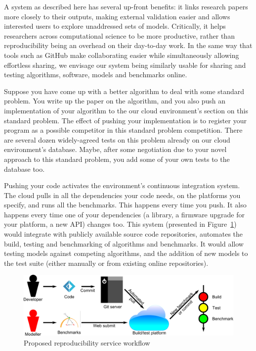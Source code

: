 \documentclass[a4paper,11pt]{article}
\begin{document}
A system as described here has several up-front benefits: it links
research papers more closely to their outputs, making external
validation easier and allows interested users to explore unaddressed
sets of models. Critically, it helps researchers across computational
science to be more productive, rather than reproducibility being an
overhead on their day-to-day work. In the same way that tools such as
GitHub make collaborating easier while simultaneously allowing
effortless sharing, we envisage our system being similarly usable for
sharing and testing algorithms, software, models and benchmarks
online.

Suppose you have come up with a better algorithm to deal with some
standard problem.  You write up the paper on the algorithm, and you
also push an implementation of your algorithm to the our cloud
environment's section on this standard problem. The effect of pushing
your implementation is to register your program as a possible
competitor in this standard problem competition. There are several
dozen widely-agreed tests on this problem already on our cloud
environment's database. Maybe, after some negotiation due to your
novel approach to this standard problem, you add some of your own
tests to the database too.

Pushing your code activates the environment's continuous integration
system.  The cloud pulls in all the dependencies your code needs, on
the platforms you specify, and runs all the benchmarks. This happens
every time you push. It also happens every time one of your
dependencies (a library, a firmware upgrade for your platform, a new
API) changes too. This system (presented in Figure~\ref{fig:workflow})
would integrate with publicly available source code repositories,
automates the build, testing and benchmarking of algorithms and
benchmarks. It would allow testing models against competing
algorithms, and the addition of new models to the test suite (either
manually or from existing online repositories).

\begin{figure}[!ht]
\centering
\includegraphics[width=0.9\columnwidth]{images/workflow.png}
\caption{Proposed reproducibility service workflow}
\label{fig:workflow} 
\end{figure}
\end{document}
